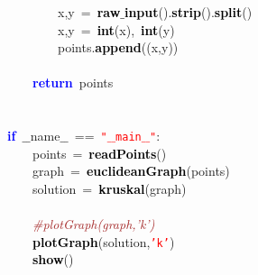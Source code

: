 \mbox{}\ \ \ \ \ \ \ \ x\textcolor{BrickRed}{,}y\ \textcolor{BrickRed}{=}\ \textbf{\textcolor{Black}{raw$\_$input}}\textcolor{BrickRed}{().}\textbf{\textcolor{Black}{strip}}\textcolor{BrickRed}{().}\textbf{\textcolor{Black}{split}}\textcolor{BrickRed}{()} \\
\mbox{}\ \ \ \ \ \ \ \ x\textcolor{BrickRed}{,}y\ \textcolor{BrickRed}{=}\ \textbf{\textcolor{Black}{int}}\textcolor{BrickRed}{(}x\textcolor{BrickRed}{),}\ \textbf{\textcolor{Black}{int}}\textcolor{BrickRed}{(}y\textcolor{BrickRed}{)} \\
\mbox{}\ \ \ \ \ \ \ \ points\textcolor{BrickRed}{.}\textbf{\textcolor{Black}{append}}\textcolor{BrickRed}{((}x\textcolor{BrickRed}{,}y\textcolor{BrickRed}{))} \\
\mbox{} \\
\mbox{}\ \ \ \ \textbf{\textcolor{Blue}{return}}\ points \\
\mbox{} \\
\mbox{} \\
\mbox{}\textbf{\textcolor{Blue}{if}}\ $\_$$\_$name$\_$$\_$\ \textcolor{BrickRed}{==}\ \texttt{\textcolor{Red}{"{}$\_$$\_$main$\_$$\_$"{}}}\textcolor{BrickRed}{:} \\
\mbox{}\ \ \ \ points\ \textcolor{BrickRed}{=}\ \textbf{\textcolor{Black}{readPoints}}\textcolor{BrickRed}{()} \\
\mbox{}\ \ \ \ graph\ \textcolor{BrickRed}{=}\ \textbf{\textcolor{Black}{euclideanGraph}}\textcolor{BrickRed}{(}points\textcolor{BrickRed}{)} \\
\mbox{}\ \ \ \ solution\ \textcolor{BrickRed}{=}\ \textbf{\textcolor{Black}{kruskal}}\textcolor{BrickRed}{(}graph\textcolor{BrickRed}{)} \\
\mbox{}\ \ \ \  \\
\mbox{}\ \ \ \ \textit{\textcolor{Brown}{\#plotGraph(graph,'k')}} \\
\mbox{}\ \ \ \ \textbf{\textcolor{Black}{plotGraph}}\textcolor{BrickRed}{(}solution\textcolor{BrickRed}{,}\texttt{\textcolor{Red}{'k'}}\textcolor{BrickRed}{)} \\
\mbox{}\ \ \ \ \textbf{\textcolor{Black}{show}}\textcolor{BrickRed}{()} \\
\mbox{}

